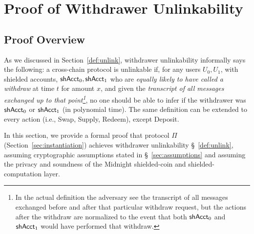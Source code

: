\section{Proof of Withdrawer Unlinkability}
\label{sec:proof}



\subsection{Proof Overview}
As we discussed in Section~\ref{def:unlink}, withdrawer unlinkability informally says the following:
a cross-chain protocol is unlinkable if, for any users $U_0,U_1$, with shielded accounts, $\mathsf{shAcct}_0,\mathsf{shAcct}_1$  who are  \emph{equally likely to  have called a  withdraw} at time $t$ for amount $x$,   and given the \emph{transcript of all messages exchanged up to that point\footnote{In the actual definition the adversary see the transcript of all messages exchanged before and after that particular withdraw request, but the actions after the withdraw are normalized to the event that both $\mathsf{shAcct}_0$ and $\mathsf{shAcct}_1$ would have performed that withdraw.}}, no one should be able to infer if the withdrawer was $\mathsf{shAcct}_0$ or $\mathsf{shAcct}_1$ (in polynomial time).
The same definition can be extended to every action (i.e., Swap, Supply, Redeem), except Deposit.

In this section, we provide a formal proof that  protocol $\Pi$ (Section~\ref{sec:instantiation}) achieves  withdrawer unlinkability \S~\ref{def:unlink}, assuming cryptographic assumptions stated in \S~\ref{sec:assumptions} and assuming the privacy and soundness of the Midnight shielded-coin and shielded-computation layer.

